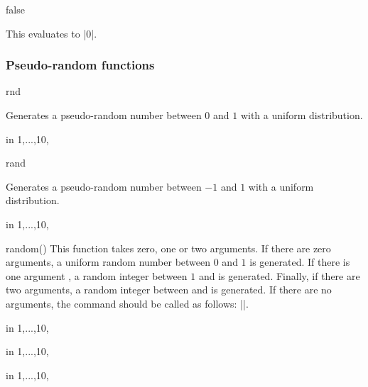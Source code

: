 \begin{math-function}{false}
\mathcommand

	This evaluates to |0|.
	
\begin{codeexample}[]
 \pgfmathresult
\end{codeexample}

\end{math-function}



\subsubsection{Pseudo-random functions}

\label{pgfmath-functions-random}

\begin{math-function}{rnd}
\mathcommand

	Generates a pseudo-random number between $0$ and $1$ with a uniform distribution.

\begin{codeexample}[]
\foreach \x in {1,...,10}{\pgfmathresult, }
\end{codeexample}

\end{math-function}

\begin{math-function}{rand}
\mathcommand

	Generates a pseudo-random number between $-1$ and $1$ with a uniform distribution.

\begin{codeexample}[]
\foreach \x in {1,...,10}{\pgfmathresult, }
\end{codeexample}

\end{math-function}

\begin{math-function}{random()}
\mathcommand
  This function takes zero, one or two arguments. If there are zero
  arguments, a uniform random number between $0$ and $1$ is generated. If there is
  one argument , a random integer between $1$ and  is
  generated. Finally, if there are two arguments, a random integer
  between  and  is generated. If there are no
  arguments, the \pgfname{} command should be called as follows:
  |\pgfmathrandom{}|.

\begin{codeexample}[]
\foreach \x in {1,...,10}{\pgfmathresult, }
\end{codeexample}

\begin{codeexample}[]
\foreach \x in {1,...,10}{\pgfmathresult, }
\end{codeexample}

\begin{codeexample}[]
\foreach \x in {1,...,10}{\pgfmathresult, }
\end{codeexample}
\end{math-function}

